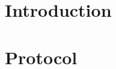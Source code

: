 \documentclass[a4paper, twocolumn]{article}
\begin{document}

\section{Introduction}


\section{Protocol}
\end{document}
